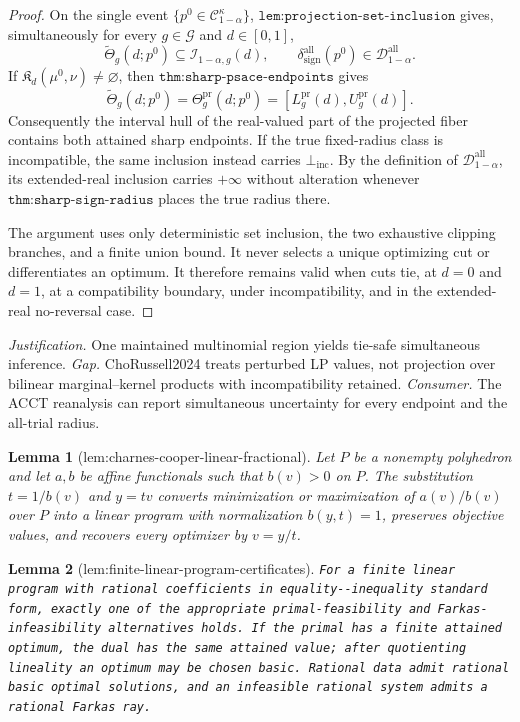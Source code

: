 \documentclass{article}
\newtheorem{lemma}{Lemma}
\begin{document}
\begin{proof}
On the single event \(\{p^0\in\mathcal C_{1-\alpha}^{\kappa}\}\), \(\texttt{lem:projection-set-inclusion}\) gives, simultaneously for every \(g\in\mathcal G\) and \(d\in[0,1]\),
\[
 \widetilde\Theta_g(d;p^0)\subseteq\mathcal I_{1-\alpha,g}(d),
 \qquad
 \delta_{\mathrm{sign}}^{\mathrm{all}}(p^0)
 \in\mathcal D_{1-\alpha}^{\mathrm{all}}.
\]
If \(\mathfrak K_d(\mu^0,\nu)\neq\varnothing\), then \(\texttt{thm:sharp-psace-endpoints}\) gives
\[
 \widetilde\Theta_g(d;p^0)=\Theta_g^{\mathrm{pr}}(d;p^0)
 =[L_g^{\mathrm{pr}}(d),U_g^{\mathrm{pr}}(d)].
\]
Consequently the interval hull of the real-valued part of the projected fiber contains both attained sharp endpoints. If the true fixed-radius class is incompatible, the same inclusion instead carries \(\bot_{\mathrm{inc}}\). By the definition of \(\mathcal D_{1-\alpha}^{\mathrm{all}}\), its extended-real inclusion carries \(+\infty\) without alteration whenever \(\texttt{thm:sharp-sign-radius}\) places the true radius there.

The argument uses only deterministic set inclusion, the two exhaustive clipping branches, and a finite union bound. It never selects a unique optimizing cut or differentiates an optimum. It therefore remains valid when cuts tie, at \(d=0\) and \(d=1\), at a compatibility boundary, under incompatibility, and in the extended-real no-reversal case.
\end{proof}
\par\smallskip\noindent \textit{Justification.} One maintained multinomial region yields tie-safe simultaneous inference. \textit{Gap.} ChoRussell2024 treats perturbed LP values, not projection over bilinear marginal--kernel products with incompatibility retained. \textit{Consumer.} The ACCT reanalysis can report simultaneous uncertainty for every endpoint and the all-trial radius.

\begin{lemma}[lem:charnes-cooper-linear-fractional]\label{lem:charnes-cooper-linear-fractional}
Let \(P\) be a nonempty polyhedron and let \(a,b\) be affine functionals such that \(b(v)>0\) on \(P\).  The substitution \(t=1/b(v)\) and \(y=tv\) converts minimization or maximization of \(a(v)/b(v)\) over \(P\) into a linear program with normalization \(b(y,t)=1\), preserves objective values, and recovers every optimizer by \(v=y/t\).
\end{lemma}

\begin{lemma}[lem:finite-linear-program-certificates]\label{lem:finite-linear-program-certificates}
\texttt{For a finite linear program with rational coefficients in equality-\allowbreak{}-\allowbreak{}inequality standard form,\allowbreak{} exactly one of the appropriate primal-\allowbreak{}feasibility and Farkas-\allowbreak{}infeasibility alternatives holds.  If the primal has a finite attained optimum,\allowbreak{} the dual has the same attained value;\allowbreak{} after quotienting lineality an optimum may be chosen basic.  Rational data admit rational basic optimal solutions,\allowbreak{} and an infeasible rational system admits a rational Farkas ray.}
\end{lemma}
\end{document}

